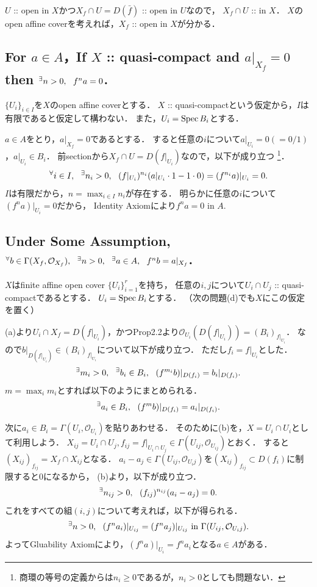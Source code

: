 \documentclass[a4paper]{jsarticle}
\newcommand{\shO}{\mathcal{O}}
\begin{document}
    $U$ :: open in $X$かつ$X_f \cap U=D(\bar{f})$ :: open in $U$なので，
    $X_f \cap U$ :: in $X$．
    $X$のopen affine coverを考えれば，$X_f$ :: open in $X$が分かる．

    \subsection{For $a \in A$，If $X$ :: quasi-compact and $a|_{X_f}=0$ then ${}^{\exists} n > 0,~~ f^n a=0$.}
    $\{U_i\}_{i \in I}$を$X$のopen affine coverとする．
    $X$ :: quasi-compactという仮定から，$I$は有限であると仮定して構わない．
    また，$U_i = \operatorname{Spec} B_i$とする．

    $a \in A$をとり，$a|_{X_f}=0$であるとする．
    すると任意の$i$について$a|_{U_i}=0(=0/1)$，$a|_{U_i} \in B_i$．
    前sectionから$X_f \cap U=D(f|_{U_i})$なので，以下が成り立つ
    \footnote{商環の等号の定義からは$n_i \geq 0$であるが，$n_i>0$としても問題ない．}．
    \[ {}^{\forall} i \in I,~~ {}^{\exists} n_i>0,~~ (f|_{U_i})^{n_i}(a|_{U_i} \cdot 1-1 \cdot 0)=(f^{n_i}a)|_{U_i}=0. \]
    $I$は有限だから，$n=\max_{i \in I} n_i$が存在する．
    明らかに任意の$i$について$(f^{n}a)|_{U_i}=0$だから，
    Identity Axiomにより$f^n a=0$ in $A$.

    \subsection{Under Some Assumption, $\Forall{b \in \Gamma(X_f, \shO_{X_f})} \Exists{n>0} \Exists{a \in A} f^n b=a|_{X_f}$.}
    $X$はfinite affine open cover $\{U_i\}_{i=1}^r$を持ち，
    任意の$i,j$について$U_i \cap U_j$ :: quasi-compactであるとする．
    $U_i=\operatorname{Spec} B_i$とする．
    （次の問題(d)でも$X$にこの仮定を置く）

    (a)より$U_i \cap X_f=D(f|_{U_i})$，かつProp2.2より$\shO_{U_i}(D(f|_{U_i}))=(B_i)_{f|_{U_i}}$．
    なので$b|_{D(f|_{U_i})} \in (B_i)_{f|_{U_i}}$について以下が成り立つ．
    ただし$f_i=f|_{U_i}$とした．
    \[ {}^{\exists} m_i>0,~~ {}^{\exists} b_i \in B_i,~~ (f^{m_i}b)|_{D(f_i)}=b_i|_{D(f_i)}. \]
    $m=\max_i m_i$とすれば以下のようにまとめられる．
    \[ {}^{\exists} a_i \in B_i,~~ (f^{m}b)|_{D(f_i)}=a_i|_{D(f_i)}. \]

    次に$a_i \in B_i=\Gamma(U_i, \shO_{U_i})$を貼りあわせる．
    そのために(b)を，$X=U_i \cap U_i$として利用しよう．
    $X_{ij}=U_i \cap U_j, f_{ij}=f|_{U_i \cap U_j} \in \Gamma(U_{ij},\shO_{U_{ij}})$とおく．
    すると$(X_{ij})_{f_{ij}}=X_f \cap X_{ij}$となる．
    $a_i-a_j \in \Gamma(U_{ij},\shO_{U_ij})$を$(X_{ij})_{f_{ij}} \subset D(f_{i})$に制限すると0になるから，
    (b)より，以下が成り立つ．
    \[ {}^{\exists} n_{ij}>0,~~ (f_{ij})^{n_{ij}}(a_i-a_j)=0. \]
    これをすべての組$(i,j)$について考えれば，以下が得られる．
    \[ \Exists{n>0} (f^n a_i)|_{U_{ij}}=(f^n a_j)|_{U_{ij}} \text{ in } \Gamma(U_{ij},\shO_{U_ij}).  \]
    よってGluability Axiomにより，$(f^n a)|_{U_i}=f^n a_i$となる$a \in A$がある．
\end{document}
